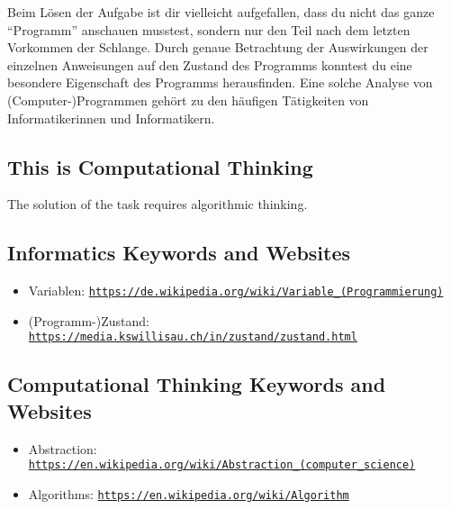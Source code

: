 \documentclass[a4paper,11pt]{report}
\newcommand{\BrochureUrlText}[1]{\texttt{#1}}
\begin{document}
Beim Lösen der Aufgabe ist dir vielleicht aufgefallen, dass du nicht das ganze “Programm” anschauen musstest, sondern nur den Teil nach dem letzten Vorkommen der Schlange.  Durch genaue Betrachtung der Auswirkungen der einzelnen Anweisungen auf den Zustand des Programms konntest du eine besondere Eigenschaft des Programms herausfinden.  Eine solche Analyse von (Computer-)Programmen gehört zu den häufigen Tätigkeiten von Informatikerinnen und Informatikern.


\subsection*{This is Computational Thinking}

The solution of the task requires algorithmic thinking.


\subsection*{Informatics Keywords and Websites}

\begin{itemize}
  \item Variablen: \href{https://de.wikipedia.org/wiki/Variable_(Programmierung)}{\BrochureUrlText{https://de.wikipedia.org/wiki/Variable\_(Programmierung)}}
  \item (Programm-)Zustand: \href{https://media.kswillisau.ch/in/zustand/zustand.html}{\BrochureUrlText{https://media.kswillisau.ch/in/zustand/zustand.html}}
\end{itemize}


\subsection*{Computational Thinking Keywords and Websites}

\begin{itemize}
  \item Abstraction: \href{https://en.wikipedia.org/wiki/Abstraction_(computer_science)}{\BrochureUrlText{https://en.wikipedia.org/wiki/Abstraction\_(computer\_science)}}
  \item Algorithms: \href{https://en.wikipedia.org/wiki/Algorithm}{\BrochureUrlText{https://en.wikipedia.org/wiki/Algorithm}}
\end{itemize}
\end{document}
